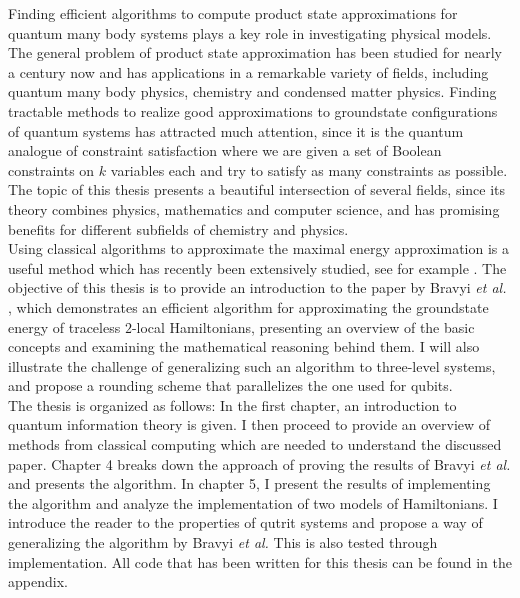 Finding efficient algorithms to compute product state approximations for quantum many body systems plays a key role in investigating physical models.
The general problem of product state approximation has been studied for nearly a century now and has applications in a remarkable variety of fields, including quantum many body physics, chemistry and condensed matter physics.
Finding tractable methods to realize good approximations to groundstate configurations of quantum systems has attracted much attention, since it is the quantum analogue of constraint satisfaction where we are given a set of Boolean constraints on $k$ variables each and try to satisfy as many constraints as possible.
The topic of this thesis presents a beautiful intersection of several fields, since its theory combines physics, mathematics and computer science, and has promising benefits for different subfields of chemistry and physics.\\
Using classical algorithms to approximate the maximal energy approximation is a useful method which has recently been extensively studied, see for example \cite{gharibian19, gharibian12, kempe06, brandao14, harrow17,bravyi19,anshu20}.
The objective of this thesis is to provide an introduction to the paper by Bravyi \emph{et al.} \cite{bravyi19}, which demonstrates an efficient algorithm for approximating the groundstate energy of traceless $2$-local Hamiltonians, presenting an overview of the basic concepts and examining the mathematical reasoning behind them.
I will also illustrate the challenge of generalizing such an algorithm to three-level systems, and propose a rounding scheme that parallelizes the one used for qubits.\\
The thesis is organized as follows:
In the first chapter, an introduction to quantum information theory is given.
I then proceed to provide an overview of methods from classical computing which are needed to understand the discussed paper.
Chapter 4 breaks down the approach of proving the results of Bravyi \emph{et al.} and presents the algorithm.
In chapter 5, I present the results of implementing the algorithm and analyze the implementation of two models of Hamiltonians.
I introduce the reader to the properties of qutrit systems and propose a way of generalizing the algorithm by Bravyi \emph{et al.}
This is also tested through implementation.
All code that has been written for this thesis can be found in the appendix.
